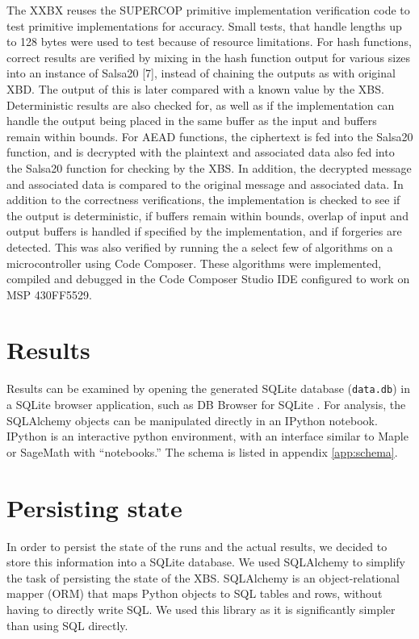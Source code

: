 \documentclass[twoside,11pt]{cergdoc}
\begin{document}
The XXBX reuses the SUPERCOP
primitive implementation verification code
to test primitive implementations for
accuracy. Small tests, that handle lengths up
to 128 bytes were used to test because of
resource limitations. For hash functions,
correct results are verified by mixing in the
hash function output for various sizes into
an instance of Salsa20 [7], instead of
chaining the outputs as with original XBD.
The output of this is later compared
with a known value by the XBS.
Deterministic results are also checked for, as
well as if the implementation can handle the
output being placed in the same buffer as the
input and buffers remain within bounds. For
AEAD functions, the ciphertext is fed into
the Salsa20 function, and is decrypted with
the plaintext and associated data also fed
into the Salsa20 function for checking by the
XBS.
In addition, the decrypted message
and associated data is compared to the
original message and associated data. In
addition to the correctness verifications, the
implementation is checked to see if the
output is deterministic, if buffers remain
within bounds, overlap of input and output
buffers is handled if specified by the
implementation, and if forgeries are
detected.
This was also verified by running the
a select few of algorithms on a
microcontroller using Code Composer.
These algorithms were implemented,
compiled and
debugged in the Code Composer Studio IDE
configured to work on MSP 430FF5529.


  \section{Results}
Results can be examined by opening the generated SQLite database
(\texttt{data.db}) in a SQLite browser application, such as DB Browser for
SQLite \cite{sqlitebrowser}. For analysis, the SQLAlchemy objects can be
manipulated directly in an IPython \cite{ipython} notebook. IPython is an
interactive python environment, with an interface similar to Maple or SageMath
with ``notebooks.'' The schema is listed in appendix \ref{app:schema}.

  \section{Persisting state}
In order to persist the state of the runs and the actual results, we decided
to store this information into a SQLite \cite{sqlite} database. We used
SQLAlchemy \cite{sqlalchemy} to simplify the task of persisting the state of the
XBS. SQLAlchemy is an object-relational mapper (ORM) that maps Python objects to
SQL tables and rows, without having to directly write SQL. We used this library
as it is significantly simpler than using SQL directly.
\end{document}
